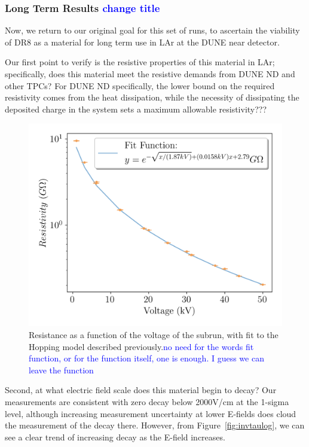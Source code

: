 \documentclass[a4paper,12pt]{article}
\newcommand{\RI}[1]{\textcolor{blue}{#1}}
\begin{document}
\subsubsection{Long Term Results \RI{change title}}
\label{sec:long_term_results}
Now, we return to our original goal for this set of runs, to ascertain the viability of DR8 as a material for long term use in LAr at the DUNE near detector. 

Our first point to verify is the resistive properties of this material in LAr; specifically, does this material meet the resistive demands from DUNE ND and other TPCs? For DUNE ND specifically, the lower bound on the required resistivity comes from the heat dissipation, while the necessity of dissipating the deposited charge in the system sets a maximum allowable resistivity???

\begin{figure}
	\begin{center}
		
		\includegraphics[width=0.75\linewidth]{Efield_Z.png}
		\caption{Resistance as a function of the voltage of the subrun, with fit to the Hopping model described previously.\RI{no need for the words fit function, or for the function itself, one is enough. I guess we can leave the function}} 
		\label{fig:resvsvol}
	\end{center}
\end{figure}


Second, at what electric field scale does this material begin to decay? Our measurements are consistent with zero decay below 2000V/cm at the 1-sigma level, although increasing measurement uncertainty at lower E-fields does cloud the measurement of the decay there. However, from Figure~\ref{fig:invtaulog}, we can see a clear trend of increasing decay as the E-field increases.
\end{document}
